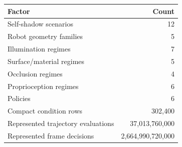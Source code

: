 \begin{tabular}{lr}
\toprule
Factor & Count \\
\midrule
Self-shadow scenarios & 12 \\
Robot geometry families & 5 \\
Illumination regimes & 7 \\
Surface/material regimes & 5 \\
Occlusion regimes & 4 \\
Proprioception regimes & 6 \\
Policies & 6 \\
Compact condition rows & 302,400 \\
Represented trajectory evaluations & 37,013,760,000 \\
Represented frame decisions & 2,664,990,720,000 \\
\bottomrule
\end{tabular}

